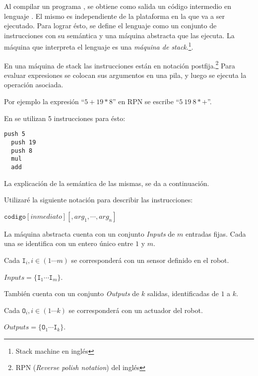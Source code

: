   Al compilar un programa \frob{}, se obtiene como salida un código
intermedio en lenguaje \alf{}.
  El mismo es independiente de la plataforma en la que va a ser ejecutado.
  Para lograr ésto, se define el lenguaje como un conjunto de instrucciones
con su semántica y una máquina abstracta que las ejecuta.
  La máquina que interpreta el lenguaje \alf{} es una
\textit{máquina de stack}.\footnote{Stack machine en inglés}.

  En una máquina de stack las instrucciones están en notación
postfija.\footnote{RPN (\textit{Reverse polish notation}) del inglés}
  Para evaluar expresiones se colocan sus argumentos en una pila, y luego
se ejecuta la operación asociada.
  
  Por ejemplo la expresión ``$5 + 19 * 8$'' en RPN se
  escribe ``$5\ 19\ 8 * +$''.
  
  En \alf{} se utilizan 5 instrucciones para ésto:

  \begin{Verbatim}[frame=single]
  push 5
  push 19
  push 8
  mul
  add
  \end{Verbatim}

  La explicación de la semántica de las mismas, se da a continuación.

  Utilizaré la siguiente notación para describir las instrucciones:
  \begin{center}
    $\texttt{codigo} [\textit{inmediato}] [, {arg}_1, \dotsb, {arg}_n ]$
  \end{center}

  La máquina abstracta cuenta con un conjunto \textit{Inputs} de $m$
  entradas fijas. Cada una se identifica con un entero único entre
  $1$ y $m$.

  Cada $\texttt{I}_i, i \in (1 \dotsb m)$ se corresponderá con un sensor
  definido en el robot.
  

  \begin{center}
    $\textit{Inputs} = \{\texttt{I}_1 \dotsb \texttt{I}_m\}$.
  \end{center}

  También cuenta con un conjunto \textit{Outputs} de $k$ salidas,
  identificadas de $1$ a $k$.
  
  Cada $\texttt{O}_i, i \in (1 \dotsb k)$ se corresponderá con un actuador
  del robot.

  \begin{center}
    $\textit{Outputs} = \{\texttt{O}_1 \dotsb \texttt{I}_k\}$.
  \end{center}

